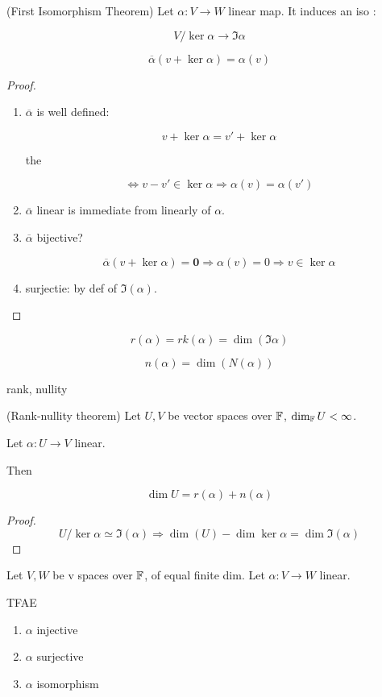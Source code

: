 \documentclass[a4paper]{article}
\begin{document}
\begin{thm} (First Isomorphism Theorem)
	Let $ \alpha : V \to W $ linear map. It induces an iso :
	
	\[ V / \ker \alpha \to \Im \alpha \] %
	
	\[ \overline{\alpha} (v + \ker \alpha) = \alpha(v) \]
	
	
\end{thm}

\begin{proof}
	\begin{enumerate}
		\item  $ \overline{\alpha} $ is well defined:
	
	\[ v + \ker \alpha = v' + \ker \alpha \]
	
	the
	
	\[ \iff v - v' \in \ker \alpha \Rightarrow \alpha(v) = \alpha(v') \]
	
	\item $ \overline{\alpha} $ linear is immediate from linearly of $ \alpha $.
	
	\item $ \overline{\alpha} $ bijective? 
	
	\[ \overline{\alpha}(v + \ker \alpha  ) = \mathbf{0} \Rightarrow \alpha(v) = 0 \Rightarrow v \in \ker \alpha \]
	
	\item surjectie: by def of $ \Im(\alpha) $.		
	\end{enumerate}
	
	
\end{proof}


\begin{defi}
	\[ r(\alpha) = rk(\alpha) = \dim (\Im \alpha) \]
	
	\[ n(\alpha) = \dim(N(\alpha)) \]
	
	rank, nullity
\end{defi}

\begin{thm} (Rank-nullity theorem)
	Let $ U,V $ be vector spaces over $ \mathbb{F} $, $ \dim_{\mathbb{F}} U < \infty $.
	
	Let $ \alpha : U \to V $ linear.
	
	Then
	
	\[ \dim U = r(\alpha) + n(\alpha) \]
\end{thm}


\begin{proof}
	\[ U / \ker \alpha \simeq \Im (\alpha) \Rightarrow \dim(U) - \dim \ker \alpha = \dim \Im(\alpha) \]
\end{proof}

\begin{lemma} 
	Let $ V,W $ be v spaces over $ \mathbb{F} $, of equal finite dim. Let $ \alpha : V \to W $ linear. 
	
	TFAE
	
	\begin{enumerate}
		\item $ \alpha $ injective
		\item $ \alpha $ surjective
		\item $ \alpha $ isomorphism
		
	\end{enumerate}
\end{lemma}
\end{document}
